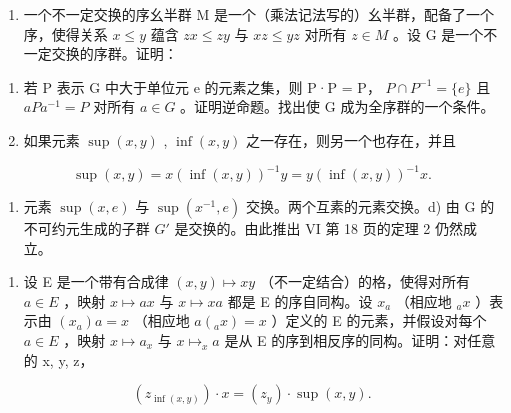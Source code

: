 \BourbakiExerciseGroup

\begin{enumerate}
\def\labelenumi{\arabic{enumi})}
\tightlist
\item
  一个不一定交换的序幺半群 M 是一个（乘法记法写的）幺半群，配备了一个序，使得关系 \(x \leqslant y\) 蕴含 \(zx \leqslant zy\) 与 \(xz \leqslant yz\) 对所有 \(z \in M\) 。设 G 是一个不一定交换的序群。证明：
\end{enumerate}

\begin{enumerate}
\def\labelenumi{\alph{enumi})}
\item
  若 P 表示 G 中大于单位元 e 的元素之集，则 P·P = P， \(P \cap P^{-1} = \{e\}\) 且 \(aPa^{-1} = P\) 对所有 \(a \in G\) 。证明逆命题。找出使 G 成为全序群的一个条件。
\item
  如果元素 \(\sup (x,y)\) , \(\inf (x,y)\) 之一存在，则另一个也存在，并且
\end{enumerate}

\[
\sup (x, y) = x (\inf (x, y)) ^ {- 1} y = y (\inf (x, y)) ^ {- 1} x.
\]

\begin{enumerate}
\def\labelenumi{\alph{enumi})}
\setcounter{enumi}{2}
\tightlist
\item
  元素 \(\sup(x, e)\) 与 \(\sup(x^{-1}, e)\) 交换。两个互素的元素交换。d) 由 G 的不可约元生成的子群 \(G'\) 是交换的。由此推出 VI 第 18 页的定理 2 仍然成立。
\end{enumerate}

\begin{enumerate}
\def\labelenumi{\arabic{enumi})}
\setcounter{enumi}{1}
\tightlist
\item
  设 E 是一个带有合成律 \((x, y) \mapsto xy\) （不一定结合）的格，使得对所有 \(a \in E\) ，映射 \(x \mapsto ax\) 与 \(x \mapsto xa\) 都是 E 的序自同构。设 \(x_{a}\) （相应地 \(_{a}x\) ）表示由 \((x_{a})a = x\) （相应地 \(a(_{a}x) = x\) ）定义的 E 的元素，并假设对每个 \(a \in E\) ，映射 \(x \mapsto a_{x}\) 与 \(x \mapsto_{x} a\) 是从 E 的序到相反序的同构。证明：对任意的 x, y, z，
\end{enumerate}

\[
\left(z _ {\inf (x, y)}\right) \cdot x = \left(z _ {y}\right) \cdot \sup (x, y).
\]

